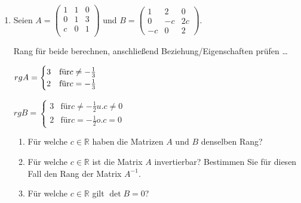 \documentclass[12pt,a4paper]{scrreprt}
\newcommand{\R}{\mathds{R}}
\newcommand{\Lsg}{\textbf{Lsg.:}}
\begin{document}
\begin{enumerate}
	\item Seien $A=\begin{pmatrix}
 1 & 1 & 0 \\
 0 & 1 & 3 \\
 c & 0 & 1 \\ \end{pmatrix}$
 und $B=\begin{pmatrix}
 1 & 2 & 0 \\
 0 & -c & 2c \\
-c & 0 & 2 \end{pmatrix}.$ 

Rang für beide berechnen, anschließend Beziehung/Eigenschaften prüfen \ldots

$
rg A = \begin{cases}
	3 & \text{für} c \neq - \frac{1}{3} \\
	2 & \text{für} c=-\frac{1}{3}
\end{cases} \\
$

$
rg B = \begin{cases}
	3 & \text{für} c \neq - \frac{1}{2} u. c \neq 0 \\
	2 & \text{für}  c=-\frac{1}{2} o. c=0
\end{cases}
$

	\begin{enumerate}
		\item Für welche $c \in \R$ haben die Matrizen $A$ und $B$ denselben Rang?
		\item Für welche $c \in \R$ ist die Matrix $A$ invertierbar? Bestimmen Sie für diesen Fall den Rang der Matrix $A^{-1}$.
		\item Für welche $c \in \R$ gilt $\det B=0$?
	\end{enumerate}

\end{enumerate}
\end{document}
